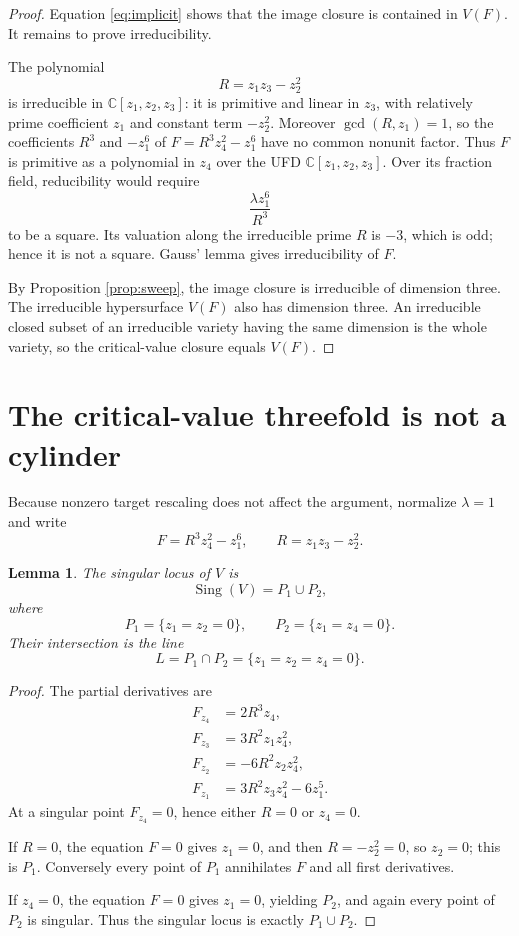\documentclass[11pt]{article}
\newtheorem{lemma}[theorem]{Lemma}
\theoremstyle{definition}
\newcommand{\C}{\mathbb C}
\newcommand{\Sing}{\operatorname{Sing}}
\begin{document}
\begin{proof}
Equation \eqref{eq:implicit} shows that the image closure is contained in $V(F)$. It remains to prove irreducibility.

The polynomial
\[
R=z_1z_3-z_2^2
\]
is irreducible in $\C[z_1,z_2,z_3]$: it is primitive and linear in $z_3$, with relatively prime coefficient $z_1$ and constant term $-z_2^2$. Moreover $\gcd(R,z_1)=1$, so the coefficients $R^3$ and $-z_1^6$ of $F=R^3z_4^2-z_1^6$ have no common nonunit factor. Thus $F$ is primitive as a polynomial in $z_4$ over the UFD $\C[z_1,z_2,z_3]$. Over its fraction field, reducibility would require
\[
\frac{\lambda z_1^6}{R^3}
\]
to be a square. Its valuation along the irreducible prime $R$ is $-3$, which is odd; hence it is not a square. Gauss' lemma gives irreducibility of $F$.

By Proposition \ref{prop:sweep}, the image closure is irreducible of dimension three. The irreducible hypersurface $V(F)$ also has dimension three. An irreducible closed subset of an irreducible variety having the same dimension is the whole variety, so the critical-value closure equals $V(F)$.
\end{proof}

\section{The critical-value threefold is not a cylinder}

Because nonzero target rescaling does not affect the argument, normalize $\lambda=1$ and write
\[
F=R^3z_4^2-z_1^6,
\qquad
R=z_1z_3-z_2^2.
\]

\begin{lemma}\label{lem:sing}
The singular locus of $V$ is
\[
\Sing(V)=P_1\cup P_2,
\]
where
\[
P_1=\{z_1=z_2=0\},
\qquad
P_2=\{z_1=z_4=0\}.
\]
Their intersection is the line
\[
L=P_1\cap P_2=\{z_1=z_2=z_4=0\}.
\]
\end{lemma}

\begin{proof}
The partial derivatives are
\begin{align*}
F_{z_4}&=2R^3z_4,\\
F_{z_3}&=3R^2z_1z_4^2,\\
F_{z_2}&=-6R^2z_2z_4^2,\\
F_{z_1}&=3R^2z_3z_4^2-6z_1^5.
\end{align*}
At a singular point $F_{z_4}=0$, hence either $R=0$ or $z_4=0$.

If $R=0$, the equation $F=0$ gives $z_1=0$, and then $R=-z_2^2=0$, so $z_2=0$; this is $P_1$. Conversely every point of $P_1$ annihilates $F$ and all first derivatives.

If $z_4=0$, the equation $F=0$ gives $z_1=0$, yielding $P_2$, and again every point of $P_2$ is singular. Thus the singular locus is exactly $P_1\cup P_2$.
\end{proof}
\end{document}
